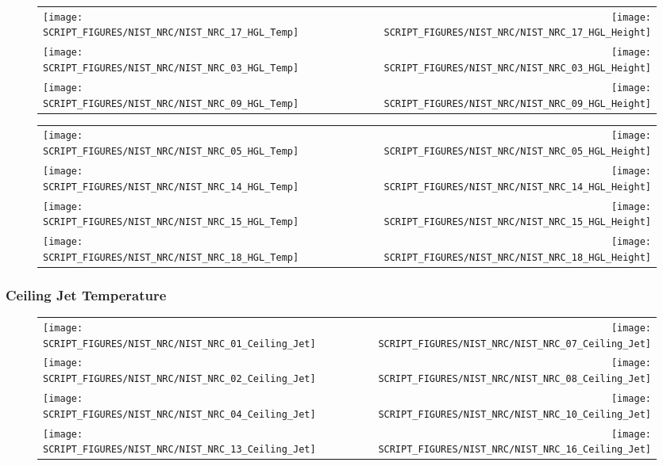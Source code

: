\begin{figure}[!ht]
\begin{tabular*}{\textwidth}{l@{\extracolsep{\fill}}r}
\texttt{[image: SCRIPT\_FIGURES/NIST\_NRC/NIST\_NRC\_17\_HGL\_Temp]} &
\texttt{[image: SCRIPT\_FIGURES/NIST\_NRC/NIST\_NRC\_17\_HGL\_Height]} \\
\texttt{[image: SCRIPT\_FIGURES/NIST\_NRC/NIST\_NRC\_03\_HGL\_Temp]} &
\texttt{[image: SCRIPT\_FIGURES/NIST\_NRC/NIST\_NRC\_03\_HGL\_Height]} \\
\texttt{[image: SCRIPT\_FIGURES/NIST\_NRC/NIST\_NRC\_09\_HGL\_Temp]} &
\texttt{[image: SCRIPT\_FIGURES/NIST\_NRC/NIST\_NRC\_09\_HGL\_Height]}
\end{tabular*}
\end{figure}

\begin{figure}[!ht]
\begin{tabular*}{\textwidth}{l@{\extracolsep{\fill}}r}
\texttt{[image: SCRIPT\_FIGURES/NIST\_NRC/NIST\_NRC\_05\_HGL\_Temp]} &
\texttt{[image: SCRIPT\_FIGURES/NIST\_NRC/NIST\_NRC\_05\_HGL\_Height]} \\
\texttt{[image: SCRIPT\_FIGURES/NIST\_NRC/NIST\_NRC\_14\_HGL\_Temp]} &
\texttt{[image: SCRIPT\_FIGURES/NIST\_NRC/NIST\_NRC\_14\_HGL\_Height]} \\
\texttt{[image: SCRIPT\_FIGURES/NIST\_NRC/NIST\_NRC\_15\_HGL\_Temp]} &
\texttt{[image: SCRIPT\_FIGURES/NIST\_NRC/NIST\_NRC\_15\_HGL\_Height]} \\
\texttt{[image: SCRIPT\_FIGURES/NIST\_NRC/NIST\_NRC\_18\_HGL\_Temp]} &
\texttt{[image: SCRIPT\_FIGURES/NIST\_NRC/NIST\_NRC\_18\_HGL\_Height]}
\end{tabular*}
\end{figure}

\clearpage

\subsubsection{Ceiling Jet Temperature}

\begin{figure}[!ht]
\begin{tabular*}{\textwidth}{l@{\extracolsep{\fill}}r}
\texttt{[image: SCRIPT\_FIGURES/NIST\_NRC/NIST\_NRC\_01\_Ceiling\_Jet]} &
\texttt{[image: SCRIPT\_FIGURES/NIST\_NRC/NIST\_NRC\_07\_Ceiling\_Jet]} \\
\texttt{[image: SCRIPT\_FIGURES/NIST\_NRC/NIST\_NRC\_02\_Ceiling\_Jet]} &
\texttt{[image: SCRIPT\_FIGURES/NIST\_NRC/NIST\_NRC\_08\_Ceiling\_Jet]} \\
\texttt{[image: SCRIPT\_FIGURES/NIST\_NRC/NIST\_NRC\_04\_Ceiling\_Jet]} &
\texttt{[image: SCRIPT\_FIGURES/NIST\_NRC/NIST\_NRC\_10\_Ceiling\_Jet]} \\
\texttt{[image: SCRIPT\_FIGURES/NIST\_NRC/NIST\_NRC\_13\_Ceiling\_Jet]} &
\texttt{[image: SCRIPT\_FIGURES/NIST\_NRC/NIST\_NRC\_16\_Ceiling\_Jet]}
\end{tabular*}
\label{NIST_NRC_Jet_Closed}
\end{figure}

